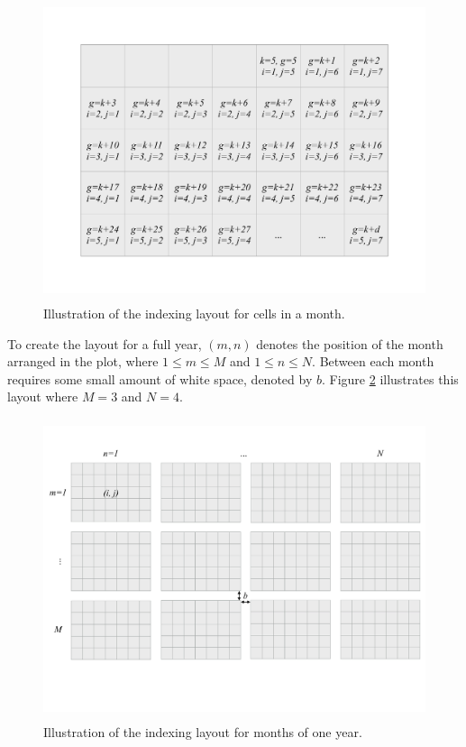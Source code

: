 \documentclass[article]{jss}
\theoremstyle{definition}
\theoremstyle{definition}
\theoremstyle{remark}
\begin{document}
\begin{CodeChunk}
\begin{figure}

{\centering \includegraphics[width=360pt,height=250pt]{figure/month} 

}

\caption[Illustration of the indexing layout for cells in
a month.]{Illustration of the indexing layout for cells in
a month.}\label{fig:month-diagram}
\end{figure}
\end{CodeChunk}




To create the layout for a full year, \((m, n)\) denotes the position of
the month arranged in the plot, where \(1 \le m \le M\) and
\(1 \le n \le N\). Between each month requires some small amount of
white space, denoted by \(b\). Figure \ref{fig:year-diagram} illustrates
this layout where \(M = 3\) and \(N = 4\).

\begin{CodeChunk}
\begin{figure}

{\centering \includegraphics[width=360pt,height=250pt]{figure/year-diagram} 

}

\caption[Illustration of the indexing layout for months of
one year.]{Illustration of the indexing layout for months of
one year.}\label{fig:year-diagram}
\end{figure}
\end{CodeChunk}
\end{document}
